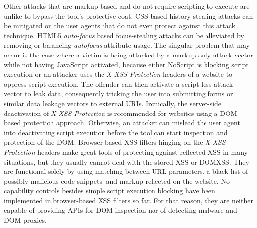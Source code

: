       Other attacks that are markup-based and do not require scripting to execute are unlike to bypass the tool's protective coat. CSS-based history-stealing attacks can be mitigated on the user agents that do not even protect against this attack technique. HTML5 \textit{auto-focus} based focus-stealing attacks can be alleviated by removing or balancing \textit{autofocus} attribute usage. The singular problem that may occur is the case where a victim is being attacked by a markup-only attack vector while not having JavaScript activated, because either NoScript is blocking script execution or an attacker uses the \textit{X-XSS-Protection} headers of a website to oppress script execution. The offender can then activate a script-less attack vector to leak data, consequently tricking the user into submitting forms or similar data leakage vectors to external URIs. Ironically, the server-side deactivation of \textit{X-XSS-Protection} is recommended for websites using a DOM-based protection approach. Otherwise, an attacker can mislead the user agent into deactivating script execution before the tool can start inspection and protection of the DOM. Browser-based XSS filters hinging on the \textit{X-XSS-Protection} headers  make great tools of protecting against reflected XSS in many situations, but they usually cannot deal with the stored XSS or DOMXSS. They are functional solely by using matching between URL parameters, a black-list of possibly malicious code snippets, and markup reflected on the website. No capability controls besides simple script execution blocking have been implemented in browser-based XSS filters so far. For that reason, they are neither capable of providing APIs for DOM inspection nor of detecting malware and DOM proxies.\\

